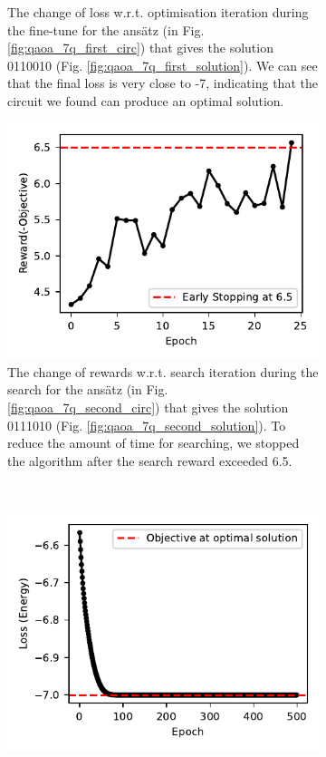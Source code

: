 \documentclass{ieeeaccess}
\begin{document}
\begin{figure}[ht!]
\begin{subfigure}[t]{0.48\linewidth}
        \caption{The change of loss w.r.t. optimisation iteration during the fine-tune for the ans\"atz (in Fig.\ref{fig:qaoa_7q_first_circ}) that gives the solution 0110010 (Fig. \ref{fig:qaoa_7q_first_solution}). We can see that the final loss is very close to -7, indicating that the circuit we found can produce an optimal solution.}
        \label{fig:qaoa_finetune_1}
    \end{subfigure}
    \hfill
    \begin{subfigure}[b]{0.48\linewidth}
        \includegraphics[width=0.99\linewidth]{peiyong_fig_22.pdf}
        \caption{The change of rewards w.r.t. search iteration during the search for the ans\"atz (in Fig.\ref{fig:qaoa_7q_second_circ}) that gives the solution 0111010 (Fig. \ref{fig:qaoa_7q_second_solution}). To reduce the amount of time for searching, we stopped the algorithm after the search reward exceeded 6.5.}
        \label{fig:qaoa_search_reward_2}
    \end{subfigure}
    ~
    \begin{subfigure}[b]{0.48\linewidth}
        \includegraphics[width=\linewidth]{peiyong_fig_23.pdf}

\end{subfigure}
\end{figure}
\end{document}
